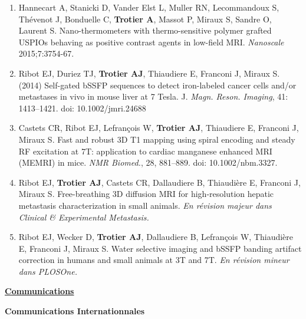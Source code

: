 \begin{enumerate}

\item Hannecart A, Stanicki D, Vander Elst L, Muller RN, Lecommandoux S, Thévenot J, Bonduelle C, \textbf{Trotier A}, Massot P, Miraux S, Sandre O, Laurent S. Nano-thermometers with thermo-sensitive polymer grafted USPIOs behaving as positive contrast agents in low-field MRI. \textit{Nanoscale} 2015;7:3754-67.

\item Ribot EJ, Duriez TJ, \textbf{Trotier AJ}, Thiaudiere E, Franconi J, Miraux S. (2014) Self-gated bSSFP sequences to detect iron-labeled cancer cells and/or metastases in vivo in mouse liver at 7 Tesla. J. \textit{Magn. Reson. Imaging}, 41: 1413–1421. doi: 10.1002/jmri.24688

\item Castets CR, Ribot EJ, Lefrançois W, \textbf{Trotier AJ}, Thiaudiere E, Franconi J, Miraux S. Fast and robust 3D T1 mapping using spiral encoding and steady RF excitation at 7T: application to cardiac manganese enhanced MRI (MEMRI) in mice. \textit{NMR Biomed.}, 28, 881–889. doi: 10.1002/nbm.3327.

\item Ribot EJ, \textbf{Trotier AJ}, Castets CR, Dallaudiere B, Thiaudière E, Franconi J, Miraux S. Free-breathing 3D diffusion MRI for high-resolution hepatic metastasis characterization in small animals. \textit{En révision majeur dans Clinical \& Experimental Metastasis.}

\item Ribot EJ, Wecker D, \textbf{Trotier AJ}, Dallaudiere B, Lefrançois W, Thiaudière E, Franconi J, Miraux S. Water selective imaging and bSSFP banding artifact correction in humans and small animals at 3T and 7T. \textit{En révision mineur dans PLOSOne.}

\end{enumerate}

\vspace{2em}

\underline{\Large \textbf{Communications}}

\vspace{2em}
\normalsize \textbf{Communications Internationnales}
\vspace{1em}

